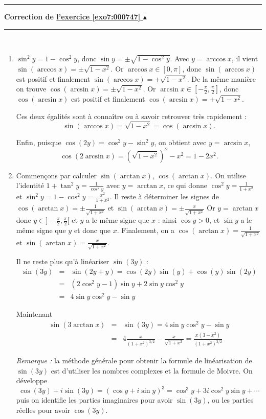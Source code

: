 \documentclass[11pt,a4paper]{article}
\newcommand{\Arcsin}{\mathop{\mathrm{arcsin}}\nolimits}
\newcommand{\Arccos}{\mathop{\mathrm{arccos}}\nolimits}
\newcommand{\Arctan}{\mathop{\mathrm{arctan}}\nolimits}
\newcounter{exo}
\newcommand{\correction}[1]{\hypertarget{cor7:#1}{}\label{cor7:#1}{\bf Correction de \hyperlink{exo7:#1}{l'exercice \ref{exo7:#1} $\blacktriangle$}}\vspace{1mm}\hrule\vspace{1mm}}
\newcommand{\fincorrection}{\vspace{1mm}\hrule\vspace*{7mm}}
\begin{document}
\fincorrection
\correction{000747}\
\begin{enumerate}
    \item $\sin^2 y = 1-\cos^2 y$, donc
$\sin y = \pm\sqrt{1-\cos^2 y}$.
Avec $y=\Arccos x$, il vient $\sin(\Arccos x)= \pm\sqrt{1-x^2}$. Or $\Arccos x \in [0,\pi]$, 
donc $\sin(\Arccos x)$ est positif et finalement $\sin(\Arccos x)=  +\sqrt{1-x^2}$.
De la m\^eme mani\`ere on trouve $\cos(\Arcsin x) = \pm\sqrt{1-x^2}$. 
Or $\Arcsin x \in [-\frac{\pi}{2},\frac{\pi}{2}]$, donc $\cos(\Arcsin x)$ est positif 
et finalement $\cos(\Arcsin x)=+\sqrt{1-x^2}$.

Ces deux égalités sont à connaître ou à savoir retrouver très rapidement :
$$\sin(\Arccos x)  = \sqrt{1-x^2} = \cos(\Arcsin x).$$


Enfin, puisque $\cos(2y) = \cos^2 y - \sin^2 y$, on obtient avec $y=\Arcsin x$,
$$\cos(2\Arcsin x)=(\sqrt{1-x^2})^2-x^2=1-2x^2.$$

\item Commen\c{c}ons par calculer $\sin(\Arctan x)$, $\cos(\Arctan x)$.
On utilise l'identité $1+\tan^2y=\frac 1{\cos^2 y}$ avec $y = \Arctan x$, ce qui donne 
$\cos^2 y = \frac{1}{1+x^2}$ et
 $\sin^2 y = 1-\cos^2 y=\frac{x^2}{1+x^2}$.
 Il reste à déterminer les signes de $\cos(\Arctan x)= \pm\frac{1}{\sqrt{1+x^2}}$ et $\sin(\Arctan x) = \pm\frac{x}{\sqrt{1+x^2}}$
Or $y=\Arctan x$ donc $y\in]-\frac{\pi}{2},\frac{\pi}{2}[$ et $y$ a le même signe que $x$ : 
ainsi $\cos y>0$, et $\sin y$ a le même signe que $y$ et donc que $x$. Finalement, on a 
$\cos(\Arctan x)= \frac{1}{\sqrt{1+x^2}}$ et $\sin(\Arctan x) = \frac{x}{\sqrt{1+x^2}}$.

\medskip


Il ne reste plus qu'à linéariser $\sin(3y)$ :
\begin{eqnarray*}
\sin(3y) &=& \sin(2y+y)=\cos(2y)\sin(y)+\cos(y)\sin(2y)\\
 &=&(2\cos^2 y-1)\sin y +2\sin y\cos^2y\\
 &=&4 \sin y \cos^2 y - \sin y
\end{eqnarray*}



Maintenant
\begin{eqnarray*}
\sin(3\Arctan x) &=& \sin(3y)= 4 \sin y \cos^2 y - \sin y\\
 &=& 4{\frac {x}{\left (1+{x}^{2}\right )^{3/2}}}-{\frac {x}{\sqrt {1+{x}^{2}}}}={\frac {x(3-x^2)}{\left (1+{x}^{2}\right )^{3/2}}}
\end{eqnarray*}

\bigskip

\emph{Remarque :} la méthode générale pour obtenir la formule de linéarisation de $\sin(3y)$ est 
d'utiliser les nombres complexes
et la formule de Moivre. On développe 
$$\cos(3y) + i \sin(3y) = (\cos y + i \sin y)^3 = \cos^3 y + 3i\cos^2y \sin y + \cdots$$ 
puis on identifie les parties imaginaires pour avoir $\sin(3y)$, 
ou les parties réelles pour avoir $\cos(3y)$.

\end{enumerate}
\end{document}
